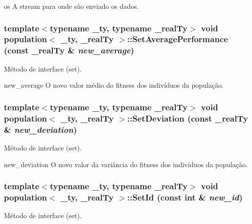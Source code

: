 os A stream para onde são enviado os dados. \hypertarget{classpopulation_a7fb6b0d19740560913aac2eb376c56fb}{
\subsubsection[{SetAveragePerformance}]{\setlength{\rightskip}{0pt plus 5cm}template$<$typename \_\-ty, typename \_\-realTy$>$ void {\bf population}$<$ \_\-ty, \_\-realTy $>$::SetAveragePerformance (const \_\-realTy \& {\em new\_\-average})}}
\label{classpopulation_a7fb6b0d19740560913aac2eb376c56fb}
Método de interface (set).

new\_\-average O novo valor médio do fitness dos indivíduos da população. \hypertarget{classpopulation_ad0b1614ed94b9eb82a8ca0e24bdc603b}{
\subsubsection[{SetDeviation}]{\setlength{\rightskip}{0pt plus 5cm}template$<$typename \_\-ty, typename \_\-realTy$>$ void {\bf population}$<$ \_\-ty, \_\-realTy $>$::SetDeviation (const \_\-realTy \& {\em new\_\-deviation})}}
\label{classpopulation_ad0b1614ed94b9eb82a8ca0e24bdc603b}
Método de interface (set).

new\_\-deviation O novo valor da variância do fitness dos indivíduos da população. \hypertarget{classpopulation_aa7803cea8fa30be9c9732d8e81f8aaf4}{
\subsubsection[{SetId}]{\setlength{\rightskip}{0pt plus 5cm}template$<$typename \_\-ty, typename \_\-realTy$>$ void {\bf population}$<$ \_\-ty, \_\-realTy $>$::SetId (const int \& {\em new\_\-id})}}
\label{classpopulation_aa7803cea8fa30be9c9732d8e81f8aaf4}
Método de interface (set).

